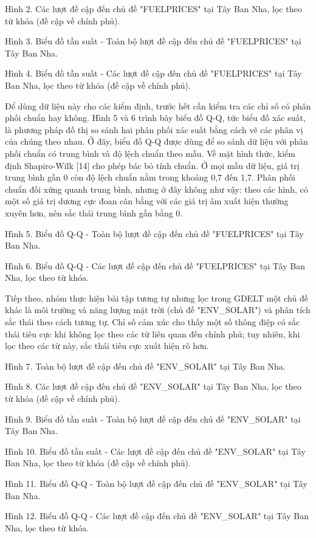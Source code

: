 Hình 2. Các lượt đề cập đến chủ đề "FUELPRICES" tại Tây Ban Nha, lọc theo từ khóa (đề cập về chính phủ).

Hình 3. Biểu đồ tần suất - Toàn bộ lượt đề cập đến chủ đề "FUELPRICES" tại Tây Ban Nha.

Hình 4. Biểu đồ tần suất - Các lượt đề cập đến chủ đề "FUELPRICES" tại Tây Ban Nha, lọc theo từ khóa (đề cập về chính phủ).

Để dùng dữ liệu này cho các kiểm định, trước hết cần kiểm tra các chỉ số có phân phối chuẩn hay không. Hình 5 và 6 trình bày biểu đồ Q-Q, tức biểu đồ xác suất, là phương pháp đồ thị so sánh hai phân phối xác suất bằng cách vẽ các phân vị của chúng theo nhau. Ở đây, biểu đồ Q-Q được dùng để so sánh dữ liệu với phân phối chuẩn có trung bình và độ lệch chuẩn theo mẫu. Về mặt hình thức, kiểm định Shapiro-Wilk {[}14{]} cho phép bác bỏ tính chuẩn. Ở mọi mẫu dữ liệu, giá trị trung bình gần 0 còn độ lệch chuẩn nằm trong khoảng 0,7 đến 1,7. Phân phối chuẩn đối xứng quanh trung bình, nhưng ở đây không như vậy: theo các hình, có một số giá trị dương cực đoan cân bằng với các giá trị âm xuất hiện thường xuyên hơn, nên sắc thái trung bình gần bằng 0.

Hình 5. Biểu đồ Q-Q - Toàn bộ lượt đề cập đến chủ đề "FUELPRICES" tại Tây Ban Nha.

Hình 6. Biểu đồ Q-Q - Các lượt đề cập đến chủ đề "FUELPRICES" tại Tây Ban Nha, lọc theo từ khóa.

Tiếp theo, nhóm thực hiện bài tập tương tự nhưng lọc trong GDELT một chủ đề khác là môi trường và năng lượng mặt trời (chủ đề "ENV\_SOLAR") và phân tích sắc thái theo cách tương tự. Chỉ số cảm xúc cho thấy một số thông điệp có sắc thái tiêu cực khi không lọc theo các từ liên quan đến chính phủ; tuy nhiên, khi lọc theo các từ này, sắc thái tiêu cực xuất hiện rõ hơn.

Hình 7. Toàn bộ lượt đề cập đến chủ đề "ENV\_SOLAR" tại Tây Ban Nha.

Hình 8. Các lượt đề cập đến chủ đề "ENV\_SOLAR" tại Tây Ban Nha, lọc theo từ khóa (đề cập về chính phủ).

Hình 9. Biểu đồ tần suất - Toàn bộ lượt đề cập đến chủ đề "ENV\_SOLAR" tại Tây Ban Nha.

Hình 10. Biểu đồ tần suất - Các lượt đề cập đến chủ đề "ENV\_SOLAR" tại Tây Ban Nha, lọc theo từ khóa (đề cập về chính phủ).

Hình 11. Biểu đồ Q-Q - Toàn bộ lượt đề cập đến chủ đề "ENV\_SOLAR" tại Tây Ban Nha.

Hình 12. Biểu đồ Q-Q - Các lượt đề cập đến chủ đề "ENV\_SOLAR" tại Tây Ban Nha, lọc theo từ khóa.

